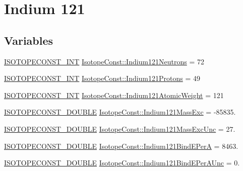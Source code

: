 \hypertarget{group___isotope_const-_indium-_in121}{}\section{Indium 121}
\label{group___isotope_const-_indium-_in121}
\subsection*{Variables}
\begin{DoxyCompactItemize}
\item 
\mbox{\hyperlink{group___isotope_const-_macros_ga5f18360b3e99483a35c32d789e62621c}{I\+S\+O\+T\+O\+P\+E\+C\+O\+N\+S\+T\+\_\+\+I\+NT}} \mbox{\hyperlink{group___isotope_const-_indium-_in121_gaf1c797ffd1ddfed365df001007818531}{Isotope\+Const\+::\+Indium121\+Neutrons}} = 72
\item 
\mbox{\hyperlink{group___isotope_const-_macros_ga5f18360b3e99483a35c32d789e62621c}{I\+S\+O\+T\+O\+P\+E\+C\+O\+N\+S\+T\+\_\+\+I\+NT}} \mbox{\hyperlink{group___isotope_const-_indium-_in121_ga302257a4824a5b45efda5d1ecb86fcd1}{Isotope\+Const\+::\+Indium121\+Protons}} = 49
\item 
\mbox{\hyperlink{group___isotope_const-_macros_ga5f18360b3e99483a35c32d789e62621c}{I\+S\+O\+T\+O\+P\+E\+C\+O\+N\+S\+T\+\_\+\+I\+NT}} \mbox{\hyperlink{group___isotope_const-_indium-_in121_gac07705b936f407eb57ac04b1091de10c}{Isotope\+Const\+::\+Indium121\+Atomic\+Weight}} = 121
\item 
\mbox{\hyperlink{group___isotope_const-_macros_ga8f45a7272ce02c0b4c65c44636ed719a}{I\+S\+O\+T\+O\+P\+E\+C\+O\+N\+S\+T\+\_\+\+D\+O\+U\+B\+LE}} \mbox{\hyperlink{group___isotope_const-_indium-_in121_gaef09ade440005e4a8fae780f7faa6cdc}{Isotope\+Const\+::\+Indium121\+Mass\+Exc}} = -\/85835.
\item 
\mbox{\hyperlink{group___isotope_const-_macros_ga8f45a7272ce02c0b4c65c44636ed719a}{I\+S\+O\+T\+O\+P\+E\+C\+O\+N\+S\+T\+\_\+\+D\+O\+U\+B\+LE}} \mbox{\hyperlink{group___isotope_const-_indium-_in121_ga3169df75207ae545e622e50344df726b}{Isotope\+Const\+::\+Indium121\+Mass\+Exc\+Unc}} = 27.
\item 
\mbox{\hyperlink{group___isotope_const-_macros_ga8f45a7272ce02c0b4c65c44636ed719a}{I\+S\+O\+T\+O\+P\+E\+C\+O\+N\+S\+T\+\_\+\+D\+O\+U\+B\+LE}} \mbox{\hyperlink{group___isotope_const-_indium-_in121_ga4e9a2d4ba636f79ee86bd941273569e8}{Isotope\+Const\+::\+Indium121\+Bind\+E\+PerA}} = 8463.
\item 
\mbox{\hyperlink{group___isotope_const-_macros_ga8f45a7272ce02c0b4c65c44636ed719a}{I\+S\+O\+T\+O\+P\+E\+C\+O\+N\+S\+T\+\_\+\+D\+O\+U\+B\+LE}} \mbox{\hyperlink{group___isotope_const-_indium-_in121_gaa139289ee61b43d7f673acde07ba1a41}{Isotope\+Const\+::\+Indium121\+Bind\+E\+Per\+A\+Unc}} = 0.

\end{DoxyCompactItemize}
